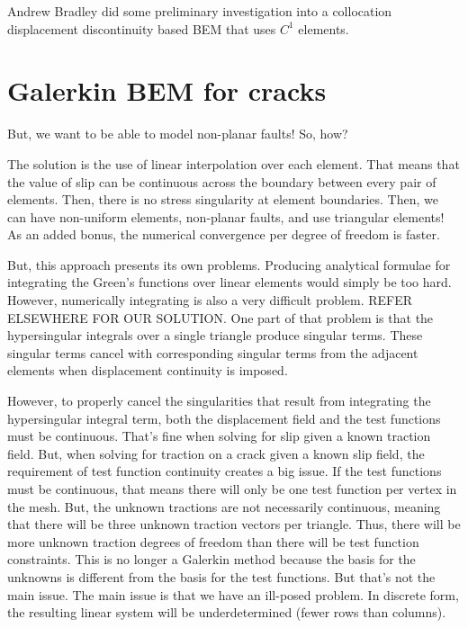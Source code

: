 \documentclass{article}
\begin{document}
{Andrew Bradley did some preliminary investigation into a collocation displacement discontinuity based BEM that uses $C^1$ elements.

\section{Galerkin BEM for cracks}

But, we want to be able to model non-planar faults! So, how?

The solution is the use of linear interpolation over each element. That means that the value of slip can be continuous across the boundary between every pair of elements. Then, there is no stress singularity at element boundaries. Then, we can have non-uniform elements, non-planar faults, and use triangular elements! As an added bonus, the numerical convergence per degree of freedom is faster. 

But, this approach presents its own problems. Producing analytical formulae for integrating the Green's functions over linear elements would simply be too hard.  However, numerically integrating is also a very difficult problem. REFER ELSEWHERE FOR OUR SOLUTION. One part of that problem is that the hypersingular integrals over a single triangle produce singular terms. These singular terms cancel with corresponding singular terms from the adjacent elements when displacement continuity is imposed. 

However, to properly cancel the singularities that result from integrating the hypersingular integral term, both the displacement field and the test functions must be continuous. That's fine when solving for slip given a known traction field. But, when solving for traction on a crack given a known slip field, the requirement of test function continuity creates a big issue. If the test functions must be continuous, that means there will only be one test function per vertex in the mesh. But, the unknown tractions are not necessarily continuous, meaning that there will be three unknown traction vectors per triangle. Thus, there will be more unknown traction degrees of freedom than there will be test function constraints. This is no longer a Galerkin method because the basis for the unknowns is different from the basis for the test functions. But that's not the main issue. The main issue is that we have an ill-posed problem. In discrete form, the resulting linear system will be underdetermined (fewer rows than columns).  

}
\end{document}
